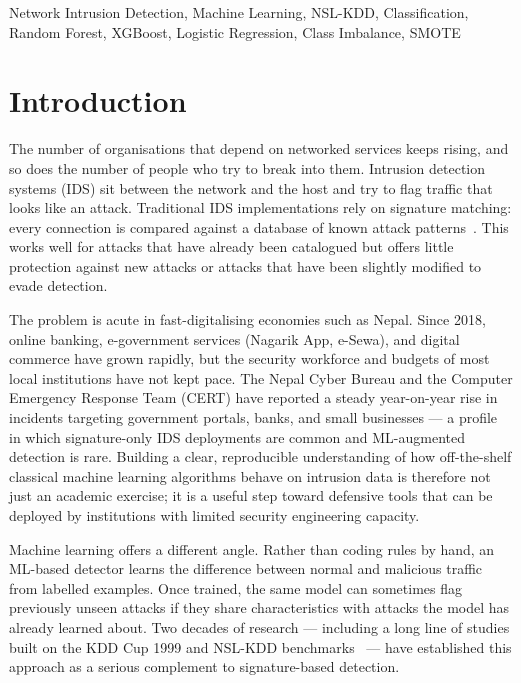 \documentclass[conference, twocolumn]{IEEEtran}
\begin{document}
\begin{IEEEkeywords}
Network Intrusion Detection, Machine Learning, NSL-KDD, Classification, Random Forest, XGBoost, Logistic Regression, Class Imbalance, SMOTE
\end{IEEEkeywords}

\section{Introduction}

The number of organisations that depend on networked services keeps rising, and so does the number of people who try to break into them. Intrusion detection systems (IDS) sit between the network and the host and try to flag traffic that looks like an attack. Traditional IDS implementations rely on signature matching: every connection is compared against a database of known attack patterns~\cite{kdd99}. This works well for attacks that have already been catalogued but offers little protection against new attacks or attacks that have been slightly modified to evade detection.

The problem is acute in fast-digitalising economies such as Nepal. Since 2018, online banking, e-government services (Nagarik App, e-Sewa), and digital commerce have grown rapidly, but the security workforce and budgets of most local institutions have not kept pace. The Nepal Cyber Bureau and the Computer Emergency Response Team (CERT) have reported a steady year-on-year rise in incidents targeting government portals, banks, and small businesses --- a profile in which signature-only IDS deployments are common and ML-augmented detection is rare. Building a clear, reproducible understanding of how off-the-shelf classical machine learning algorithms behave on intrusion data is therefore not just an academic exercise; it is a useful step toward defensive tools that can be deployed by institutions with limited security engineering capacity.

Machine learning offers a different angle. Rather than coding rules by hand, an ML-based detector learns the difference between normal and malicious traffic from labelled examples. Once trained, the same model can sometimes flag previously unseen attacks if they share characteristics with attacks the model has already learned about. Two decades of research --- including a long line of studies built on the KDD Cup 1999 and NSL-KDD benchmarks~\cite{tavallaee2009} --- have established this approach as a serious complement to signature-based detection.
\end{document}
